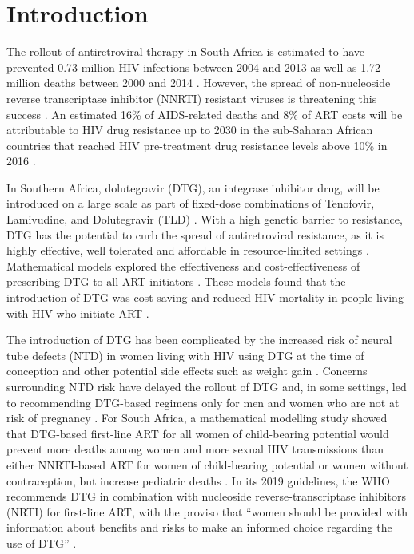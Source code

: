 \documentclass[10pt,letterpaper]{article}
\begin{document}
\linenumbers
\section*{Introduction}
The rollout of antiretroviral therapy in South Africa is estimated to have prevented 0.73 million HIV infections between 2004 and 2013 as well as 1.72 million deaths between 2000 and 2014 \cite{Heaton2015,Johnson2017a}. However, the spread of non-nucleoside reverse transcriptase inhibitor (NNRTI) resistant viruses is threatening this success \cite{Chimukangara2019b}. An estimated 16\% of AIDS-related deaths and 8\% of ART costs will be attributable to HIV drug resistance up to 2030 in the sub-Saharan African countries that reached HIV pre-treatment drug resistance levels above 10\% in 2016 \cite{Phillips2017}.

In Southern Africa, dolutegravir (DTG), an integrase inhibitor drug, will be introduced on a large scale as part of fixed-dose combinations of Tenofovir, Lamivudine, and Dolutegravir (TLD) \cite{SouthAfricaNationalDepartmentofHealth2018}. With a high genetic barrier to resistance, DTG has the potential to curb the spread of antiretroviral resistance, as it is highly effective, well tolerated and affordable in resource-limited settings \cite{Inzaule2019b,Goh2019,Tang2012,Venter2019}. Mathematical models explored the effectiveness and cost-effectiveness of prescribing DTG to all ART-initiators \cite{Phillips2018}. These models found that the introduction of DTG was cost-saving and reduced HIV mortality in people living with HIV who initiate ART \cite{Phillips2018}.

The introduction of DTG has been complicated by the increased risk of neural tube defects (NTD) in women living with HIV using DTG at the time of conception \cite{WHO_dtg} and other potential side effects such as weight gain \cite{Group2019,Venter2019}. Concerns surrounding NTD risk have delayed the rollout of DTG and, in some settings, led to recommending DTG-based regimens only for men and women who are not at risk of pregnancy \cite{Zash2019,dtg_saphra}. For South Africa, a mathematical modelling study showed that DTG-based first-line ART for all women of child-bearing potential would prevent more deaths among women and more sexual HIV transmissions than either NNRTI-based ART for women of child-bearing potential or women without contraception, but increase pediatric deaths \cite{Dugdale2019}. In its 2019 guidelines, the WHO recommends DTG in combination with nucleoside reverse-transcriptase inhibitors (NRTI) for first-line ART, with the proviso that “women should be provided with information about benefits and risks to make an informed choice regarding the use of DTG” \cite{WHO2019}. 
\end{document}

